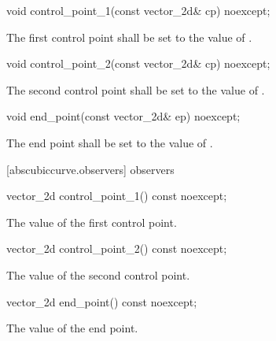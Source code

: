 \begin{itemdecl}
    void control_point_1(const vector_2d& cp) noexcept;
\end{itemdecl}
\begin{itemdescr}
	\pnum
	\effects
	The first control point shall be set to the value of .
\end{itemdescr}

\begin{itemdecl}
    void control_point_2(const vector_2d& cp) noexcept;
\end{itemdecl}
\begin{itemdescr}
	\pnum
	\effects
	The second control point shall be set to the value of .
\end{itemdescr}

\begin{itemdecl}
    void end_point(const vector_2d& ep) noexcept;
\end{itemdecl}
\begin{itemdescr}
	\pnum
	\effects
	The end point shall be set to the value of .
\end{itemdescr}

 [abscubiccurve.observers]{ observers}

\begin{itemdecl}
    vector_2d control_point_1() const noexcept;
\end{itemdecl}
\begin{itemdescr}
	\pnum
	\returns
	The value of the first control point.
\end{itemdescr}

\begin{itemdecl}
    vector_2d control_point_2() const noexcept;
\end{itemdecl}
\begin{itemdescr}
	\pnum
	\returns
	The value of the second control point.
\end{itemdescr}

\begin{itemdecl}
    vector_2d end_point() const noexcept;
\end{itemdecl}
\begin{itemdescr}
	\pnum
	\returns
	The value of the end point.
\end{itemdescr}
